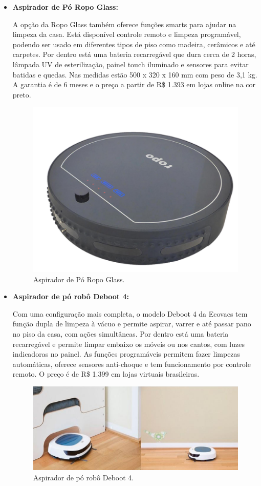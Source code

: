 \begin{itemize}
		\item \textbf{Aspirador de Pó Ropo Glass:}

			A opção da Ropo Glass também oferece funções smarts para ajudar na limpeza da casa. Está disponível controle remoto e limpeza programável, podendo ser usado em diferentes tipos de piso como madeira, cerâmicos e até carpetes. Por dentro está uma bateria recarregável que dura cerca de 2 horas, lâmpada UV de esterilização, painel touch iluminado e sensores para evitar batidas e quedas. Nas medidas estão 500 x 320 x 160 mm com peso de 3,1 kg. A garantia é de 6 meses e o preço a partir de R\$ 1.393 em lojas online na cor preto.

			\begin{figure}[H]
				\centering
				\includegraphics[scale=0.55]{figuras/pm_ropo_glass.png}
				\caption{Aspirador de Pó Ropo Glass.}
				\label{img:pm_ropo_glass}
			\end{figure}

		\item \textbf{Aspirador de pó robô Deboot 4:}

			Com uma configuração mais completa, o modelo Deboot 4 da Ecovacs tem função dupla de limpeza à vácuo e permite aspirar, varrer e até passar pano no piso da casa, com ações simultâneas. Por dentro está uma bateria recarregável e permite limpar embaixo os móveis ou nos cantos, com luzes indicadoras no painel. As funções programáveis permitem fazer limpezas automáticas, oferece sensores anti-choque e tem funcionamento por controle remoto. O preço é de R\$ 1.399 em lojas virtuais brasileiras.

			\begin{figure}[H]
				\centering
				\includegraphics[scale=0.55]{figuras/pm_deboot_4.png}
				\caption{Aspirador de pó robô Deboot 4.}
				\label{img:pm_deboot_4}
			\end{figure}


\end{itemize}
